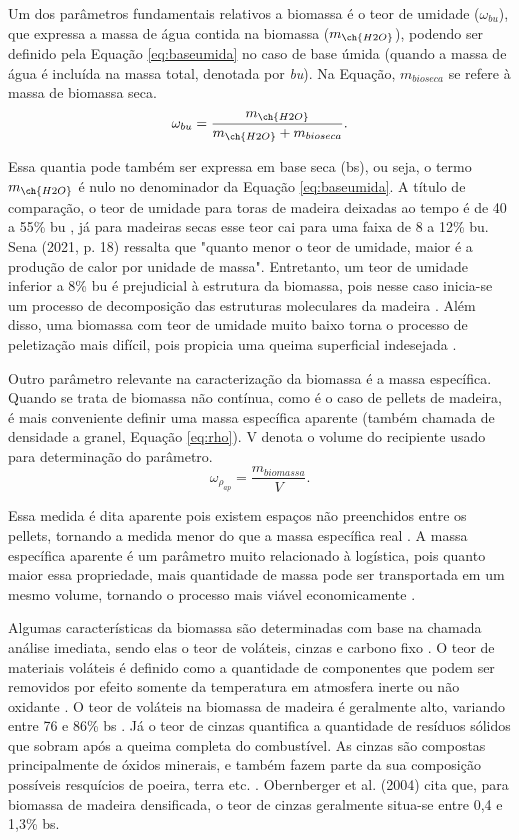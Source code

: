 Um dos parâmetros fundamentais relativos a biomassa é o teor de umidade ($\omega_{bu}$), que expressa a massa de água contida na biomassa ($m_{\ch{H2O}}$), podendo ser definido pela Equação \eqref{eq:baseumida} no caso de base úmida (quando a massa de água é incluída na massa total, denotada por \textit{bu}). Na Equação, $m_{bio seca}$ se refere à massa de biomassa seca.
\begin{equation} \label{eq:baseumida}
\omega_{bu} = \frac{m_{\ch{H2O}}}{m_{\ch{H2O}}+m_{bio seca}}.
\end{equation}

\noindent Essa quantia pode também ser expressa em base seca (bs), ou seja, o termo $m_{\ch{H2O}}$ é nulo no denominador da Equação \eqref{eq:baseumida}. A título de comparação, o teor de umidade para toras de madeira deixadas ao tempo é de 40 a 55\% bu , já para madeiras secas esse teor cai para uma faixa de 8 a 12\% bu. Sena (2021, p. 18) ressalta que "quanto menor o teor de umidade, maior é a produção de calor por unidade de massa". Entretanto, um teor de umidade inferior a 8\% bu é prejudicial à estrutura da biomassa, pois nesse caso inicia-se um processo de decomposição das estruturas moleculares da madeira \cite{Amazonia}. Além disso, uma biomassa com teor de umidade muito baixo torna o processo de peletização mais difícil, pois propicia uma queima superficial indesejada \cite{Sena2021}.

Outro parâmetro relevante na caracterização da biomassa é a massa específica. Quando se trata de biomassa não contínua, como é o caso de pellets de madeira, é mais conveniente definir uma massa específica aparente (também chamada de densidade a granel, Equação \eqref{eq:rho}). V denota o volume do recipiente usado para determinação do parâmetro. 
\begin{equation} \label{eq:rho}
\omega_{\rho_{ap}} = \frac{m_{biomassa}}{V}.
\end{equation}

\noindent Essa medida é dita aparente pois existem espaços não preenchidos entre os pellets, tornando a medida menor do que a massa específica real \cite{Amazonia}. A massa específica aparente é um parâmetro muito relacionado à logística, pois quanto maior essa propriedade, mais quantidade de massa pode ser transportada em um mesmo volume, tornando o processo mais viável economicamente \cite{Sena2021}.

Algumas características da biomassa são determinadas com base na chamada análise imediata, sendo elas o teor de voláteis, cinzas e carbono fixo \cite{Basu}. O teor de materiais voláteis é definido como a quantidade de componentes que podem ser removidos por efeito somente da temperatura em atmosfera inerte ou não oxidante \cite{Sena2021}. O teor de voláteis na biomassa de madeira é geralmente alto, variando entre 76 e 86\% bs \cite{Obernberger2004}. Já o teor de cinzas quantifica a quantidade de resíduos sólidos que sobram após a queima completa do combustível. As cinzas são compostas principalmente de óxidos minerais, e também fazem parte da sua composição possíveis resquícios de poeira, terra etc. \cite{Sena2021}. Obernberger et al. (2004) cita que, para biomassa de madeira densificada, o teor de cinzas geralmente situa-se entre 0,4 e 1,3\% bs. 


